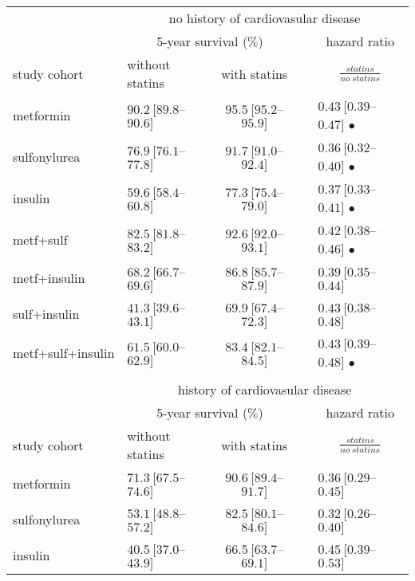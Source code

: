 \begin{table}[!h]	%
\centering
\begin{tabular}{llcll}
\toprule
			 & \multicolumn{4}{c}{no history of cardiovasular disease}\\\cline{2-5}
			 & \multicolumn{2}{c}{5-year survival ($\%$)} 		& & \multicolumn{1}{c}{hazard ratio} \\\cline{2-3} \cline{5-5}
study cohort	& without statins 	& with statins 	&	& \multicolumn{1}{c}{$\frac{statins}{no\ statins}$} \\
\midrule

metformin               & $90.2\ [89.8$--$90.6]$ & $95.5\ [95.2$--$95.9]$ & & $0.43\ [0.39$--$0.47]$ $\bullet$ \\
sulfonylurea            & $76.9\ [76.1$--$77.8]$ & $91.7\ [91.0$--$92.4]$ & & $0.36\ [0.32$--$0.40]$ $\bullet$ \\
insulin                 & $59.6\ [58.4$--$60.8]$ & $77.3\ [75.4$--$79.0]$ & & $0.37\ [0.33$--$0.41]$ $\bullet$ \\

metf+sulf               & $82.5\ [81.8$--$83.2]$ & $92.6\ [92.0$--$93.1]$ & & $0.42\ [0.38$--$0.46]$ $\bullet$ \\
metf+insulin            & $68.2\ [66.7$--$69.6]$ & $86.8\ [85.7$--$87.9]$ & & $0.39\ [0.35$--$0.44]$ \\
sulf+insulin            & $41.3\ [39.6$--$43.1]$ & $69.9\ [67.4$--$72.3]$ & & $0.43\ [0.38$--$0.48]$ \\
metf+sulf+insulin       & $61.5\ [60.0$--$62.9]$ & $83.4\ [82.1$--$84.5]$ & & $0.43\ [0.39$--$0.48]$ $\bullet$ \\
& \\
			 & \multicolumn{4}{c}{history of cardiovasular disease}\\\cline{2-5}
			 & \multicolumn{2}{c}{5-year survival ($\%$)} 		& & \multicolumn{1}{c}{hazard ratio} \\\cline{2-3} \cline{5-5}
study cohort	& without statins 	& with statins 	&	& \multicolumn{1}{c}{$\frac{statins}{no\ statins}$} \\
\midrule
metformin               & $71.3\ [67.5$--$74.6]$ & $90.6\ [89.4$--$91.7]$ & & $0.36\ [0.29$--$0.45]$ \\ %
sulfonylurea            & $53.1\ [48.8$--$57.2]$ & $82.5\ [80.1$--$84.6]$ & & $0.32\ [0.26$--$0.40]$ \\ %
insulin                 & $40.5\ [37.0$--$43.9]$ & $66.5\ [63.7$--$69.1]$ & & $0.45\ [0.39$--$0.53]$ \\ %


\end{tabular}
\end{table}
